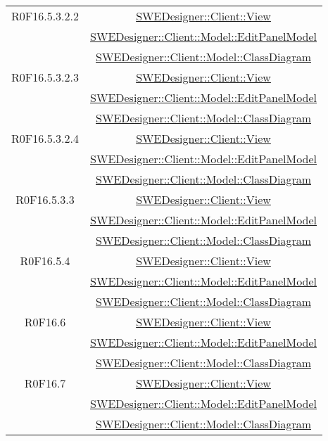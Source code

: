 \documentclass[../SpecificaTecnica.tex]{subfiles}
\begin{document}
\begin{longtable}{|c|c|}
		R0F16.5.3.2.2 & \hyperlink{SWEDesigner::Client::View}{SWEDesigner::Client::View} \\& \hyperlink{SWEDesigner::Client::Model::EditPanelModel}{SWEDesigner::Client::Model::EditPanelModel} \\& \hyperlink{SWEDesigner::Client::Model::ClassDiagram}{SWEDesigner::Client::Model::ClassDiagram}\\\hline
		R0F16.5.3.2.3 & \hyperlink{SWEDesigner::Client::View}{SWEDesigner::Client::View} \\& \hyperlink{SWEDesigner::Client::Model::EditPanelModel}{SWEDesigner::Client::Model::EditPanelModel} \\& \hyperlink{SWEDesigner::Client::Model::ClassDiagram}{SWEDesigner::Client::Model::ClassDiagram}\\\hline
		R0F16.5.3.2.4 & \hyperlink{SWEDesigner::Client::View}{SWEDesigner::Client::View} \\& \hyperlink{SWEDesigner::Client::Model::EditPanelModel}{SWEDesigner::Client::Model::EditPanelModel} \\& \hyperlink{SWEDesigner::Client::Model::ClassDiagram}{SWEDesigner::Client::Model::ClassDiagram}\\\hline
		R0F16.5.3.3 & \hyperlink{SWEDesigner::Client::View}{SWEDesigner::Client::View} \\& \hyperlink{SWEDesigner::Client::Model::EditPanelModel}{SWEDesigner::Client::Model::EditPanelModel} \\& \hyperlink{SWEDesigner::Client::Model::ClassDiagram}{SWEDesigner::Client::Model::ClassDiagram}\\\hline
		R0F16.5.4 & \hyperlink{SWEDesigner::Client::View}{SWEDesigner::Client::View} \\& \hyperlink{SWEDesigner::Client::Model::EditPanelModel}{SWEDesigner::Client::Model::EditPanelModel} \\& \hyperlink{SWEDesigner::Client::Model::ClassDiagram}{SWEDesigner::Client::Model::ClassDiagram}\\\hline
		R0F16.6 & \hyperlink{SWEDesigner::Client::View}{SWEDesigner::Client::View} \\& \hyperlink{SWEDesigner::Client::Model::EditPanelModel}{SWEDesigner::Client::Model::EditPanelModel} \\& \hyperlink{SWEDesigner::Client::Model::ClassDiagram}{SWEDesigner::Client::Model::ClassDiagram}\\\hline
		R0F16.7 & \hyperlink{SWEDesigner::Client::View}{SWEDesigner::Client::View} \\& \hyperlink{SWEDesigner::Client::Model::EditPanelModel}{SWEDesigner::Client::Model::EditPanelModel} \\& \hyperlink{SWEDesigner::Client::Model::ClassDiagram}{SWEDesigner::Client::Model::ClassDiagram}\\\hline

\end{longtable}
\end{document}
